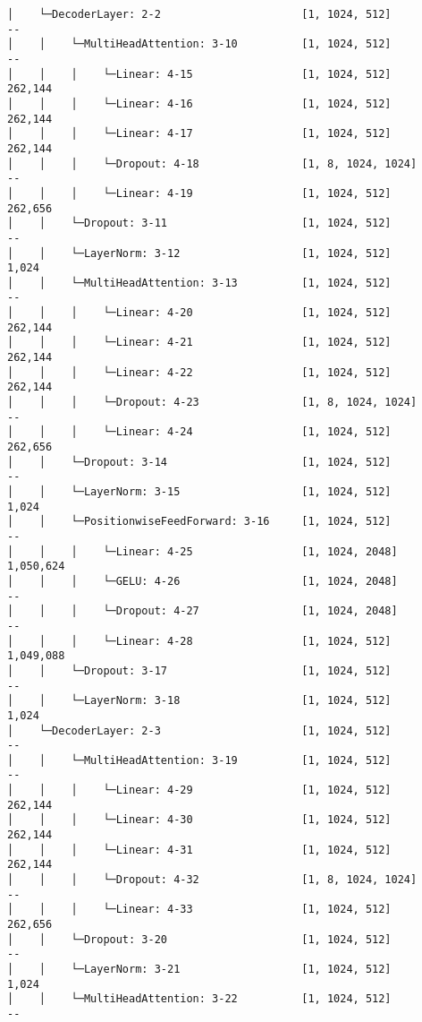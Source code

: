 \documentclass[12pt]{article}
\begin{document}
\begin{Verbatim}[commandchars=\\\{\}]
│    └─DecoderLayer: 2-2                      [1, 1024, 512]            --
│    │    └─MultiHeadAttention: 3-10          [1, 1024, 512]            --
│    │    │    └─Linear: 4-15                 [1, 1024, 512]            262,144
│    │    │    └─Linear: 4-16                 [1, 1024, 512]            262,144
│    │    │    └─Linear: 4-17                 [1, 1024, 512]            262,144
│    │    │    └─Dropout: 4-18                [1, 8, 1024, 1024]        --
│    │    │    └─Linear: 4-19                 [1, 1024, 512]            262,656
│    │    └─Dropout: 3-11                     [1, 1024, 512]            --
│    │    └─LayerNorm: 3-12                   [1, 1024, 512]            1,024
│    │    └─MultiHeadAttention: 3-13          [1, 1024, 512]            --
│    │    │    └─Linear: 4-20                 [1, 1024, 512]            262,144
│    │    │    └─Linear: 4-21                 [1, 1024, 512]            262,144
│    │    │    └─Linear: 4-22                 [1, 1024, 512]            262,144
│    │    │    └─Dropout: 4-23                [1, 8, 1024, 1024]        --
│    │    │    └─Linear: 4-24                 [1, 1024, 512]            262,656
│    │    └─Dropout: 3-14                     [1, 1024, 512]            --
│    │    └─LayerNorm: 3-15                   [1, 1024, 512]            1,024
│    │    └─PositionwiseFeedForward: 3-16     [1, 1024, 512]            --
│    │    │    └─Linear: 4-25                 [1, 1024, 2048]
1,050,624
│    │    │    └─GELU: 4-26                   [1, 1024, 2048]           --
│    │    │    └─Dropout: 4-27                [1, 1024, 2048]           --
│    │    │    └─Linear: 4-28                 [1, 1024, 512]
1,049,088
│    │    └─Dropout: 3-17                     [1, 1024, 512]            --
│    │    └─LayerNorm: 3-18                   [1, 1024, 512]            1,024
│    └─DecoderLayer: 2-3                      [1, 1024, 512]            --
│    │    └─MultiHeadAttention: 3-19          [1, 1024, 512]            --
│    │    │    └─Linear: 4-29                 [1, 1024, 512]            262,144
│    │    │    └─Linear: 4-30                 [1, 1024, 512]            262,144
│    │    │    └─Linear: 4-31                 [1, 1024, 512]            262,144
│    │    │    └─Dropout: 4-32                [1, 8, 1024, 1024]        --
│    │    │    └─Linear: 4-33                 [1, 1024, 512]            262,656
│    │    └─Dropout: 3-20                     [1, 1024, 512]            --
│    │    └─LayerNorm: 3-21                   [1, 1024, 512]            1,024
│    │    └─MultiHeadAttention: 3-22          [1, 1024, 512]            --

\end{Verbatim}
\end{document}
